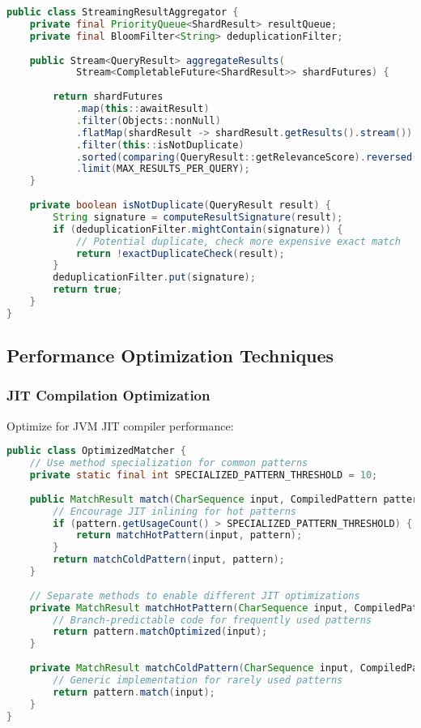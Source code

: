 \documentclass[11pt,a4paper]{article}
\begin{document}
\begin{lstlisting}[language=Java, caption=Streaming Result Aggregation]
public class StreamingResultAggregator {
    private final PriorityQueue<ShardResult> resultQueue;
    private final BloomFilter<String> deduplicationFilter;
    
    public Stream<QueryResult> aggregateResults(
            Stream<CompletableFuture<ShardResult>> shardFutures) {
        
        return shardFutures
            .map(this::awaitResult)
            .filter(Objects::nonNull)
            .flatMap(shardResult -> shardResult.getResults().stream())
            .filter(this::isNotDuplicate)
            .sorted(comparing(QueryResult::getRelevanceScore).reversed())
            .limit(MAX_RESULTS_PER_QUERY);
    }
    
    private boolean isNotDuplicate(QueryResult result) {
        String signature = computeResultSignature(result);
        if (deduplicationFilter.mightContain(signature)) {
            // Potential duplicate, check more expensive exact match
            return !exactDuplicateCheck(result);
        }
        deduplicationFilter.put(signature);
        return true;
    }
}
\end{lstlisting}

\subsection{Performance Optimization Techniques}

\subsubsection{JIT Compilation Optimization}

Optimize for JVM JIT compiler performance:

\begin{lstlisting}[language=Java, caption=JIT-Friendly Pattern Matching]
public class OptimizedMatcher {
    // Use method specialization for common patterns
    private static final int SPECIALIZED_PATTERN_THRESHOLD = 10;
    
    public MatchResult match(CharSequence input, CompiledPattern pattern) {
        // Encourage JIT inlining for hot patterns
        if (pattern.getUsageCount() > SPECIALIZED_PATTERN_THRESHOLD) {
            return matchHotPattern(input, pattern);
        }
        return matchColdPattern(input, pattern);
    }
    
    // Separate methods to enable different JIT optimizations
    private MatchResult matchHotPattern(CharSequence input, CompiledPattern pattern) {
        // Branch-predictable code for frequently used patterns
        return pattern.matchOptimized(input);
    }
    
    private MatchResult matchColdPattern(CharSequence input, CompiledPattern pattern) {
        // Generic implementation for rarely used patterns
        return pattern.match(input);
    }
}
\end{lstlisting}
\end{document}
